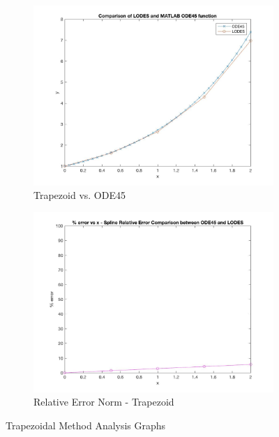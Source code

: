 \documentclass[12pt, titlepage]{article}
\begin{document}
\begin{figure}[H]
\centering
\begin{subfigure}{.55\textwidth}
  \centering
  \includegraphics[width=\linewidth]{images/Test2/2LODESvsMATLABPlot.jpg}
  \caption{Trapezoid vs. ODE45}
  \label{fig:trap2a}
\end{subfigure}%
\begin{subfigure}{.55\textwidth}
  \centering
  \includegraphics[width=\linewidth]{images/Test2/2RelativeErrorPlot.jpg}
  \caption{Relative Error Norm - Trapezoid}
  \label{fig:trap2b}
\end{subfigure}
\caption{Trapezoidal Method Analysis Graphs}
\label{fig:trap2}
\end{figure}
\end{document}
